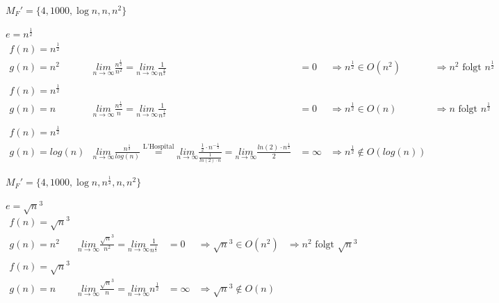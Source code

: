 \documentclass{article}
\begin{document}
\begin{flushright}
	$M_F' = \{4,1000,\operatorname{log}n,n,n^2\}$
\end{flushright}
\vspace{0.6cm}
$e = n^{\frac{1}{2}}$
\begin{equation*}
	\begin{array}{lllll}
		f(n) = n^\frac{1}{2}\\
		g(n) = n^2	&	\underset{n\rightarrow\infty}{lim}	\frac{n^\frac{1}{2}}{n^2} = \underset{n\rightarrow\infty}{lim} \frac{1}{n^\frac{3}{2}} &=	0	&\Rightarrow n^\frac{1}{2} \in O(n^2) &\Rightarrow n^2 \text{ folgt } n^\frac{1}{2}
		\\\\
		f(n) = n^\frac{1}{2}\\
		g(n) = n & \underset{n\rightarrow\infty}{lim} \frac{n^\frac{1}{2}}{n} = \underset{n\rightarrow\infty}{lim} \frac{1}{n^\frac{1}{2}} &= 0 &\Rightarrow n^\frac{1}{2} \in O(n) &\Rightarrow  n \text{ folgt } n^\frac{1}{2}
		\\\\
		f(n) = n^\frac{1}{2}\\
		g(n) = log(n) & \underset{n\rightarrow\infty}{lim} \frac{n^\frac{1}{2}}{log(n)} \overset{\text{L'Hospital}}{=} \underset{n\rightarrow\infty}{lim} \frac{\frac{1}{2}\cdot n^{-\frac{1}{2}}}{\frac{1}{ln(2)\cdot n}} = \underset{n\rightarrow\infty}{lim} \frac{ln(2)\cdot n^\frac{1}{2}}{2} &= \infty &\Rightarrow n^\frac{1}{2} \not \in O(log(n))
	\end{array}
\end{equation*}
\begin{flushright}
	$M_F' = \{4,1000,\operatorname{log}n,n^\frac{1}{2},n,n^2\}$
\end{flushright}
\vspace{0.6cm}
$e = \sqrt{n}^3$
\begin{equation*}
	\begin{array}{lllll}
		f(n) = \sqrt{n}^3\\
		g(n) = n^2	&	\underset{n\rightarrow\infty}{lim}	\frac{\sqrt{n}^3}{n^2}	= \underset{n\rightarrow\infty}{lim} \frac{1}{n^\frac{1}{2}} &=	0	&\Rightarrow \sqrt{n}^3 \in O(n^2) &\Rightarrow n^2 \text{ folgt } \sqrt{n}^3
		\\\\
		f(n) = \sqrt{n}^3\\
		g(n) = n & \underset{n\rightarrow\infty}{lim} \frac{\sqrt{n}^3}{n} = \underset{n\rightarrow\infty}{lim} n^\frac{1}{2} &= \infty &\Rightarrow \sqrt{n}^3 \not \in O(n)
	\end{array}
\end{equation*}
\end{document}
